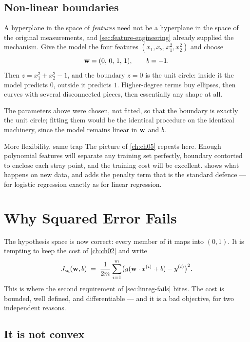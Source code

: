 \subsection{Non-linear boundaries}

A hyperplane in the space of \emph{features} need not be a hyperplane in the
space of the original measurements, and \cref{sec:feature-engineering} already
supplied the mechanism. Give the model the four features
$(x_1, x_2, x_1^2, x_2^2)$ and choose
\[
  \mathbf{w} = (0,\,0,\,1,\,1), \qquad b = -1 .
\]
Then $z = x_1^2 + x_2^2 - 1$, and the boundary $z = 0$ is the unit circle:
inside it the model predicts $0$, outside it predicts $1$. Higher-degree terms
buy ellipses, then curves with several disconnected pieces, then essentially any
shape at all.

The parameters above were chosen, not fitted, so that the boundary is exactly
the unit circle; fitting them would be the identical procedure on the identical
machinery, since the model remains linear in $\mathbf{w}$ and $b$.

\begin{pitfall}{More flexibility, same trap}
The picture of \cref{ch:ch05} repeats here. Enough polynomial features will
separate any training set perfectly, boundary contorted to enclose each stray
point, and the training cost will be excellent.  shows what
happens on new data, and adds the penalty term that is the standard defence ---
for logistic regression exactly as for linear regression.
\end{pitfall}

\section{Why Squared Error Fails}
\label{sec:squared-error-fails}

The hypothesis space is now correct: every member of it maps into $(0,1)$. It is
tempting to keep the cost of \cref{ch:ch02} and write
\[
  J_{\mathrm{sq}}(\mathbf{w},b)
  \;=\; \frac{1}{2m}\sum_{i=1}^{m}\bigl(g(\mathbf{w}\cdot x^{(i)}+b) - y^{(i)}\bigr)^2 .
\]
This is where the second requirement of \cref{sec:linreg-fails} bites. The cost
is bounded, well defined, and differentiable --- and it is a bad objective, for
two independent reasons.

\subsection{It is not convex}


